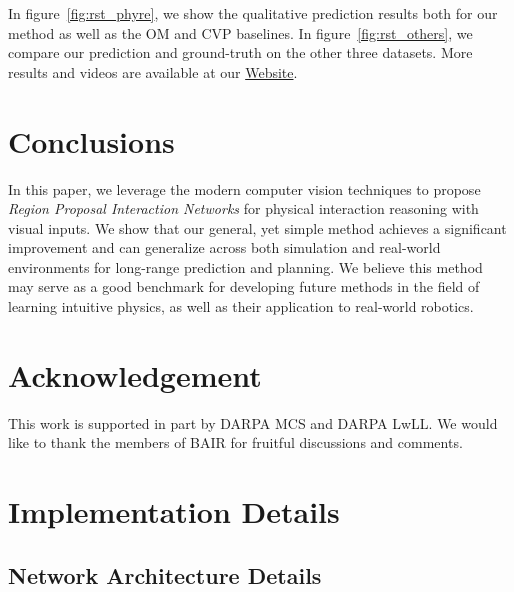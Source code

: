 \documentclass{article} \usepackage{iclr2021_conference,times}
\begin{document}
In figure~\ref{fig:rst_phyre}, we show the qualitative prediction results both for our method as well as the OM and CVP baselines. In figure~\ref{fig:rst_others}, we compare our prediction and ground-truth on the other three datasets. More results and videos are available at our \href{https://haozhiqi.github.io/RPIN}{Website}.

\vspace{-0.7em}
\section{Conclusions}
\vspace{-0.7em}
In this paper, we leverage the modern computer vision techniques to propose \textit{Region Proposal Interaction Networks} for physical interaction reasoning with visual inputs. We show that our general, yet simple method achieves a significant improvement and can generalize across both simulation and real-world environments for long-range prediction and planning. We believe this method may serve as a good benchmark for developing future methods in the field of learning intuitive physics, as well as their application to real-world robotics.

\section*{Acknowledgement}
This work is supported in part by DARPA MCS and DARPA LwLL.
We would like to thank the members of BAIR for fruitful discussions and comments.




\clearpage
\appendix

\section{Implementation Details}

\subsection{Network Architecture Details}
\end{document}
